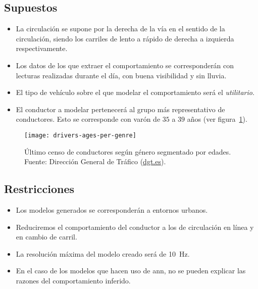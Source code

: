 \subsection{Supuestos}

\begin{itemize}
	\item La circulación se supone por la derecha de la vía en el sentido de la circulación, siendo los carriles de lento a rápido de derecha a izquierda respectivamente.
	\item Los datos de los que extraer el comportamiento se corresponderán con lecturas realizadas durante el día, con buena visibilidad y sin lluvia.
	\item El tipo de vehículo sobre el que modelar el comportamiento será el \textit{utilitario}.
	\item El conductor a modelar pertenecerá al grupo más representativo de conductores. Esto se corresponde con varón de $35$ a $39$ años (ver figura~\ref{fig:drivers-ages-per-genre}).
\end{itemize}

\begin{figure}[t]
	\centering
	\texttt{[image: drivers-ages-per-genre]}
	\caption[Censo de conductores según género y edad]{Último censo de conductores según género segmentado por edades. Fuente: Dirección General de Tráfico (\url{dgt.es}).}
	\label{fig:drivers-ages-per-genre}
\end{figure}
\subsection{Restricciones}

\begin{itemize}
	\item Los modelos generados se corresponderán a entornos urbanos.
	\item Reduciremos el comportamiento del conductor a los de circulación en línea y en cambio de carril.
	\item La resolución máxima del modelo creado será de \SI{10}{\hertz}.
	\item En el caso de los modelos que hacen uso de \acrlong{ann}, no se pueden explicar las razones del comportamiento inferido.
\end{itemize}

